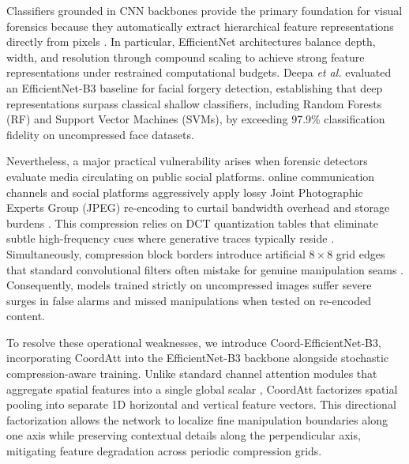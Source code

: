 \documentclass[conference]{IEEEtran}
\begin{document}
Classifiers grounded in CNN backbones provide the primary foundation for visual forensics because they automatically extract hierarchical feature representations directly from pixels \cite{tan2019efficientnet}. In particular, EfficientNet architectures balance depth, width, and resolution through compound scaling to achieve strong feature representations under restrained computational budgets. Deepa \emph{et al.} \cite{deepa2026enhanced} evaluated an EfficientNet-B3 baseline for facial forgery detection, establishing that deep representations surpass classical shallow classifiers, including Random Forests (RF) and Support Vector Machines (SVMs), by exceeding 97.9\% classification fidelity on uncompressed face datasets.

Nevertheless, a major practical vulnerability arises when forensic detectors evaluate media circulating on public social platforms. online communication channels and social platforms aggressively apply lossy Joint Photographic Experts Group (JPEG) re-encoding to curtail bandwidth overhead and storage burdens \cite{verdoliva2020media}. This compression relies on DCT quantization tables that eliminate subtle high-frequency cues where generative traces typically reside \cite{rossler2019faceforensics}. Simultaneously, compression block borders introduce artificial $8 \times 8$ grid edges that standard convolutional filters often mistake for genuine manipulation seams \cite{bondi2020training}. Consequently, models trained strictly on uncompressed images suffer severe surges in false alarms and missed manipulations when tested on re-encoded content.

To resolve these operational weaknesses, we introduce Coord-EfficientNet-B3, incorporating CoordAtt \cite{hou2021coordinate} into the EfficientNet-B3 backbone alongside stochastic compression-aware training. Unlike standard channel attention modules that aggregate spatial features into a single global scalar \cite{hu2018squeeze}, CoordAtt factorizes spatial pooling into separate 1D horizontal and vertical feature vectors. This directional factorization allows the network to localize fine manipulation boundaries along one axis while preserving contextual details along the perpendicular axis, mitigating feature degradation across periodic compression grids.
\end{document}
